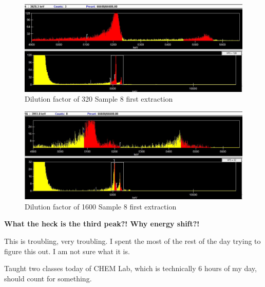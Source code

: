 \documentclass[idxtotoc,hyperref,openany,oneside]{labbook} %
\begin{document}
\begin{figure}[H] %
\begin{center}
\includegraphics[width=0.9\linewidth]{Figures/Dilution3_Sample8}
\end{center}
\caption{Dilution factor of 320 Sample 8 first extraction}
\label{fig:example_figure}
\end{figure}


\begin{figure}[H] %
\begin{center}
\includegraphics[width=0.9\linewidth]{Figures/Dilution4_Sample8}
\end{center}
\caption{Dilution factor of 1600 Sample 8 first extraction}
\label{fig:example_figure}
\end{figure}

\textbf{What the heck is the third peak?! Why energy shift?!}

This is troubling, very troubling. I spent the most of the rest of
the day trying to figure this out. I am not sure what it is.


Taught two classes today of CHEM Lab, which is technically 6 hours
of my day, should count for something.


\end{document}

